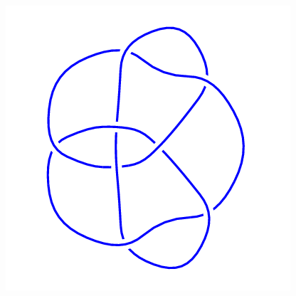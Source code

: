 \begin{figure}[H]
\begin{minipage}[b]{.18\linewidth}
	\end{minipage}
	\begin{minipage}[b]{.18\linewidth}
		\centering
		\includegraphics[width=\linewidth]{../data/8_16.png}
	\end{minipage}
\end{figure}
